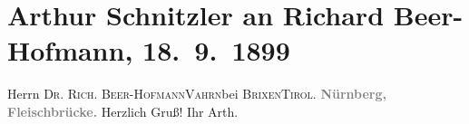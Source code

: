 

         
         \renewcommand{\erwaehntePersonen}{Personen: Richard Beer-Hofmann}
         \renewcommand{\erwaehnteOrte}{Orte: Brixen, Fleischbrücke, Nürnberg, Tirol, Vahrn}
         \renewcommand{\erwaehnteWerke}{}
               \section[Arthur Schnitzler an Richard Beer-Hofmann, 18. 9. 1899]{ Arthur Schnitzler an Richard Beer-Hofmann, 18. 9. 1899}\nopagebreak{}\rehead{ }\begin{ledgroupsized}[t]{13cm}\normalsize\beginnumbering \toendnotes[C]{\smallbreak\pagebreak[2]} 
\pstart{}{\pb}Herrn \textsc{Dr. Rich.
                     Beer-Hofmann}\pend{}\pstart{}\textsc{Vahrn}\pend{}\pstart{}bei \textsc{Brixen}\pend{}\pstart{}\textsc{Tirol}.\pend{}{\bigskip}\pstart
           \noindent{}\centering{}\textcolor{gray}{\textbf{{\pb}Nürnberg, Fleischbrücke.}}\pend
           \pstart
           Herzlich Gruß!\pend
           \pstart Ihr \spacefill\mbox{Arth.}\pend{}
         
         \endnumbering{}\end{ledgroupsized}  \newcommand{\dateiname}{L00976}\newcommand{\titel}{Arthur Schnitzler an Richard Beer-Hofmann, 18. 9. 1899}\newcommand{\editorInnen}{Martin Anton Müller und Gerd-Hermann Susen}
      